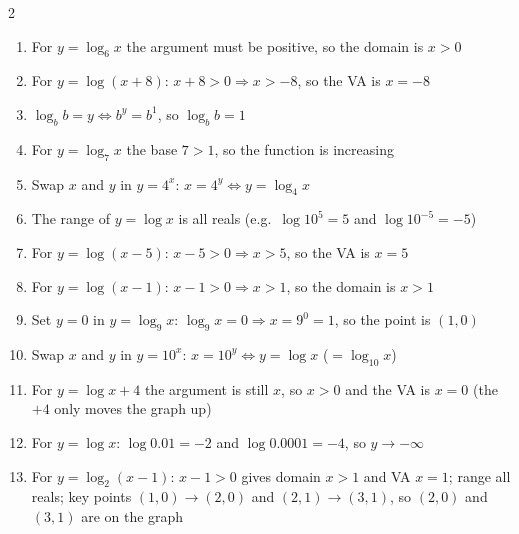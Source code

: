 \documentclass[11pt]{article}
\begin{document}
\begin{keybox}
\begin{multicols}{2}
\small
\begin{enumerate}[leftmargin=*,itemsep=3pt]
  \item For $y=\log_6x$ the argument must be positive, so the domain is $x>0$
  \item For $y=\log(x+8)$: $x+8>0\Rightarrow x>-8$, so the VA is $x=-8$
  \item $\log_bb=y\iff b^y=b^1$, so $\log_bb=1$
  \item For $y=\log_7x$ the base $7>1$, so the function is increasing
  \item Swap $x$ and $y$ in $y=4^x$: $x=4^y\iff y=\log_4x$
  \item The range of $y=\log x$ is all reals (e.g.\ $\log10^5=5$ and $\log10^{-5}=-5$)
  \item For $y=\log(x-5)$: $x-5>0\Rightarrow x>5$, so the VA is $x=5$
  \item For $y=\log(x-1)$: $x-1>0\Rightarrow x>1$, so the domain is $x>1$
  \item Set $y=0$ in $y=\log_9x$: $\log_9x=0\Rightarrow x=9^0=1$, so the point is $(1,0)$
  \item Swap $x$ and $y$ in $y=10^x$: $x=10^y\iff y=\log x$ ($=\log_{10}x$)
  \item For $y=\log x+4$ the argument is still $x$, so $x>0$ and the VA is $x=0$ (the $+4$ only moves the graph up)
  \item For $y=\log x$: $\log0.01=-2$ and $\log0.0001=-4$, so $y\to-\infty$
  \item For $y=\log_2(x-1)$: $x-1>0$ gives domain $x>1$ and VA $x=1$; range all reals; key points $(1,0)\to(2,0)$ and $(2,1)\to(3,1)$, so $(2,0)$ and $(3,1)$ are on the graph
\end{enumerate}
\end{multicols}
\end{keybox}
\end{document}
